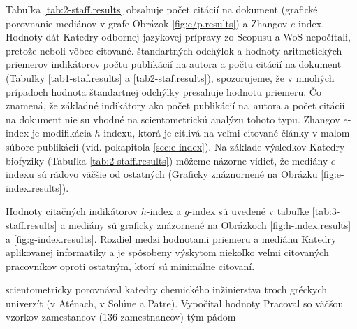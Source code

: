 Tabuľka \ref{tab:2-staff.results} obsahuje počet citácií na dokument (grafické
porovnanie mediánov v grafe Obrázok \ref{fig:c/p.results}) a Zhangov $e$-index.
Hodnoty dát Katedry odbornej jazykovej prípravy zo Scopusu a WoS nepočítali,
pretože neboli vôbec citované.  štandartných odchýlok a hodnoty aritmetických
priemerov indikátorov počtu publikácií na autora a počtu citácií na dokument
(Tabuľky \ref{tab1-staf.results} a \ref{tab2-staf.results}), spozorujeme, že v
mnohých prípadoch hodnota štandartnej odchýlky presahuje hodnotu priemeru.  Čo
znamená, že základné indikátory ako počet publikácií na~autora a počet citácií
na dokument nie su vhodné na scientometrickú analýzu tohoto typu.  Zhangov
$e$-index  je modifikácia $h$-indexu, ktorá je citlivá na veľmi citované články
v malom súbore publikácií (viď. pokapitola \ref{sec:e-index}).  Na základe
výsledkov Katedry biofyziky (Tabuľka \ref{tab:2-staff.results}) môžeme názorne
vidieť, že mediány $e$-indexu sú rádovo väčšie od ostatných (Graficky
znáznornené na Obrázku \ref{fig:e-index.results}).

Hodnoty citačných indikátorov $h$-index a $g$-index sú uvedené v tabuľke
\ref{tab:3-staff.results} a mediány sú graficky znázornené na Obrázkoch
\ref{fig:h-index.results} a \ref{fig:g-index.results}.  Rozdiel medzi hodnotami
priemeru a mediánu Katedry aplikovanej informatiky a je spôsobeny výskytom
niekoľko veľmi citovaných pracovníkov oproti ostatným, ktorí sú minimálne
citovaní.

\citet{Kazakis2015} scientometricky porovnával katedry chemického inžinierstva
troch gréckych univerzít (v Aténach, v Solúne a Patre). 
Vypočítal hodnoty Pracoval so väčšou vzorkov zamestancov (136 zamestnancov)
tým pádom 


